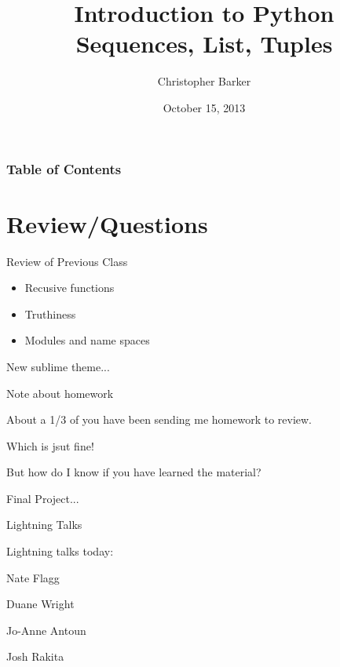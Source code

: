 \documentclass{beamer}
\title[Intro to Python: Week 3]{Introduction  to Python\\ Sequences, List, Tuples}
\author{Christopher Barker}
\institute{UW Continuing Education}
\date{October 15, 2013}
\begin{document}
\begin{frame}
  \titlepage
\end{frame}

\begin{frame}
\frametitle{Table of Contents}
  \tableofcontents
\end{frame}


\section{Review/Questions}

\begin{frame}{Review of Previous Class}

\begin{itemize}
  \item Recusive functions
  \item Truthiness
  \item Modules and name spaces
\end{itemize}

\vfill
{\large New sublime theme...}

\end{frame}

\begin{frame}{Note about homework}

{\large About a 1/3 of you have been sending me homework to review.}

\vfill
{\large Which is jsut fine!}

\vfill
{\large But how do I know if you have learned the material?}

\vfill
{\large Final Project...}

\end{frame}


\begin{frame}{Lightning Talks}

\vfill
{\LARGE Lightning talks today:}

\vfill
{\Large
Nate Flagg

\vfill
Duane Wright

\vfill
Jo-Anne Antoun 

\vfill
Josh Rakita

}
\vfill

\end{frame}
\end{document}
